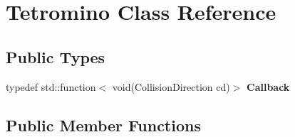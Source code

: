 \hypertarget{classTetromino}{}\section{Tetromino Class Reference}
\label{classTetromino}
\subsection*{Public Types}
\begin{DoxyCompactItemize}
\item 
\mbox{\label{classTetromino_a46651f8ddce680db2062abb69c213206}} 
typedef std\+::function$<$ void(Collision\+Direction cd)$>$ {\bfseries Callback}
\end{DoxyCompactItemize}
\subsection*{Public Member Functions}
